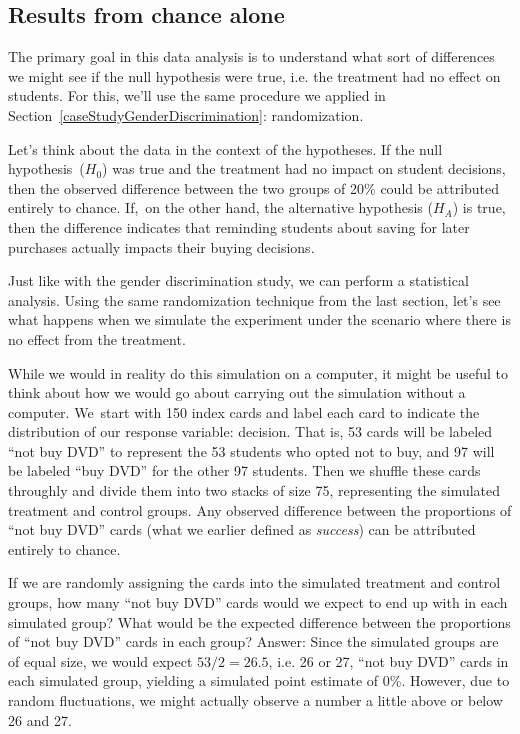 \subsection{Results from chance alone}

The primary goal in this data analysis is to understand what sort of differences we might see if the null hypothesis were true, i.e. the treatment had no effect on students. For this, we'll use the same procedure we applied in Section~\ref{caseStudyGenderDiscrimination}: randomization.

Let's think about the data in the context of the hypotheses. If the null  hypothesis~($H_0$) was true and the treatment had no impact on student decisions, then the observed difference between the two groups of 20\% could be attributed entirely to chance. If,~on the other hand, the alternative hypothesis ($H_A$) is true, then the difference indicates that reminding students about saving for later purchases actually impacts their buying decisions.

Just like with the gender discrimination study, we can perform a statistical analysis. Using the same randomization technique from the last section, let's see what happens when we simulate the experiment under the scenario where there is no effect from the treatment.

While we would in reality do this simulation on a computer, it might be useful to think about how we would go about carrying out the simulation without a computer. We~start with 150 index cards and label each card to indicate the distribution of our response variable: decision. That is, 53 cards will be labeled ``not buy DVD'' to represent the 53 students who opted not to buy, and 97 will be labeled ``buy DVD'' for the other 97 students. Then we shuffle these cards throughly and divide them into two stacks of size 75, representing the simulated treatment and control groups. Any observed difference between the proportions of ``not buy DVD'' cards (what we earlier defined as \emph{success}) can be attributed entirely to chance.

\begin{example}{If we are randomly assigning the cards into the simulated treatment and control groups, how many ``not buy DVD'' cards would we expect to end up with in each simulated group? What would be the expected difference between the proportions of ``not buy DVD'' cards in each group?}
Answer: Since the simulated groups are of equal size, we would expect $53 / 2 = 26.5$, i.e. 26 or 27, ``not buy DVD'' cards in each simulated group, yielding a simulated point estimate of 0\%. However, due to random fluctuations, we might actually observe a number a little above or below 26 and 27.
\end{example}

